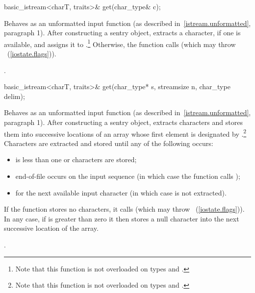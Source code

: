 %
%
\begin{itemdecl}
basic_istream<charT, traits>& get(char_type& c);
\end{itemdecl}

\begin{itemdescr}
\pnum
\effects
Behaves as an unformatted input function
(as described in~\ref{istream.unformatted}, paragraph 1).
After constructing a sentry object, extracts
a character, if one is available, and assigns it to .\footnote{Note
that this function is not overloaded on types
and
.}
Otherwise, the function calls
(which may throw
~(\ref{iostate.flags})).

\pnum
\returns
{}.
\end{itemdescr}

%
%
\begin{itemdecl}
basic_istream<charT, traits>& get(char_type* s, streamsize n,
                                  char_type delim);
\end{itemdecl}

\begin{itemdescr}
\pnum
\effects
Behaves as an unformatted input function
(as described in~\ref{istream.unformatted}, paragraph 1).
After constructing a sentry object, extracts
characters and stores them
into successive locations of an array whose first element is designated by
.\footnote{Note that this function is not overloaded on types
and
.}
Characters are extracted and stored until any of the following occurs:
\begin{itemize}
\item
{} is less than one or 
characters are stored;
\item
end-of-file occurs on the input sequence
(in which case the function calls
);
\item
{}
for the next available input
character 
(in which case  is not extracted).
\end{itemize}

\pnum
If the function stores no characters, it calls
(which may throw
~(\ref{iostate.flags})).
In any case, if  is greater than zero it then stores a null character
into the next successive location of the array.

\pnum
\returns
{}.
\end{itemdescr}

